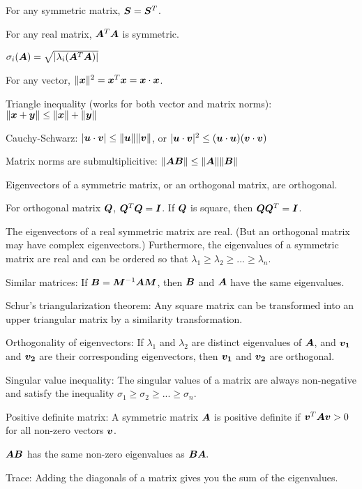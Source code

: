 \documentclass[twoside,10pt]{article}
\begin{document}
For any symmetric matrix, $\bm{S} = \bm{S}^T$.

For any real matrix, $\bm{A}^T\bm{A}$ is symmetric.

$\sigma_i(\bm{A}) = \sqrt{|\lambda_i(\bm{A}^T\bm{A})|}$

For any vector, $\|\bm{x}\|^2 = \bm{x}^T\bm{x} = \bm{x} \cdot \bm{x}$.

Triangle inequality (works for both vector and matrix norms): $\|\bm{x} + \bm{y}\| \leq \|\bm{x}\| + \|\bm{y}\|$

Cauchy-Schwarz: $|\bm{u} \cdot \bm{v}| \leq \|\bm{u}\| \|\bm{v}\|$, or $|\bm{u} \cdot \bm{v}|^2 \leq (\bm{u}\cdot\bm{u})(\bm{v}\cdot\bm{v})$

Matrix norms are submultiplicitive: $\|\bm{A}\bm{B}\| \leq \|\bm{A}\|\|\bm{B}\|$

Eigenvectors of a symmetric matrix, or an orthogonal matrix, are orthogonal.

For orthogonal matrix $\bm{Q}$, $\bm{Q}^T\bm{Q} = \bm{I}$.
If $\bm{Q}$ is square, then $\bm{Q}\bm{Q}^T = \bm{I}$.

The eigenvectors of a real symmetric matrix are real.
(But an orthogonal matrix may have complex eigenvectors.)
Furthermore, the eigenvalues of a symmetric matrix are real and can be ordered so that $\lambda_1 \geq \lambda_2 \geq ... \geq \lambda_n$. 

Similar matrices: If $\bm{B} = \bm{M}^{-1}\bm{A}\bm{M}$, then $\bm{B}$ and $\bm{A}$ have the same eigenvalues.

Schur's triangularization theorem: Any square matrix can be transformed into an upper triangular matrix by a similarity transformation.

Orthogonality of eigenvectors: If $\lambda_1$ and $\lambda_2$ are distinct eigenvalues of $\bm{A}$, and $\bm{v_1}$ and $\bm{v_2}$ are their corresponding eigenvectors, then $\bm{v_1}$ and $\bm{v_2}$ are orthogonal.

Singular value inequality: The singular values of a matrix are always non-negative and satisfy the inequality $\sigma_1 \geq \sigma_2 \geq ... \geq \sigma_n$.

Positive definite matrix: A symmetric matrix $\bm{A}$ is positive definite if $\bm{v}^T\bm{A}\bm{v} > 0$ for all non-zero vectors $\bm{v}$.

$\bm{A}\bm{B}$ has the same non-zero eigenvalues as $\bm{B}\bm{A}.$

Trace: Adding the diagonals of a matrix gives you the sum of the eigenvalues.
\end{document}
